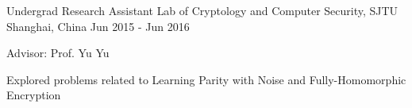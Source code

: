 \begin{cventries}

\cventry
{Undergrad Research Assistant} %
{Lab of Cryptology and Computer Security, SJTU} %
{Shanghai, China} %
{Jun 2015 - Jun 2016} %
{ %
\begin{cvitems}
\item {Advisor: Prof. Yu Yu}
\item {Explored problems related to Learning Parity with Noise and Fully-Homomorphic Encryption}
\end{cvitems} 
}


\end{cventries}
